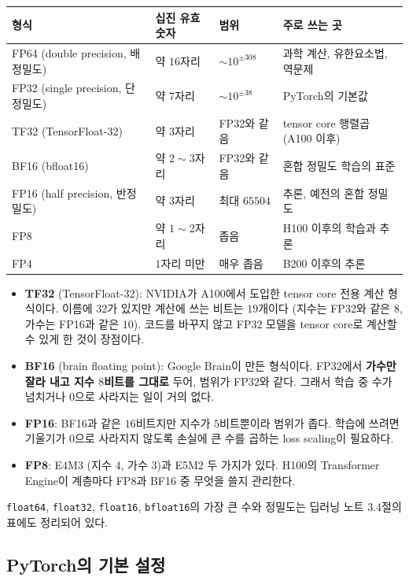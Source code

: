 \documentclass[11pt,a4paper]{article}
\begin{document}
\begin{center}
{\small
\begin{tabular}{@{}llll@{}}
\toprule
형식 & 십진 유효숫자 & 범위 & 주로 쓰는 곳 \\
\midrule
FP64 (double precision, 배정밀도) & 약 $16$자리 & $\sim10^{\pm308}$ & 과학 계산, 유한요소법, 역문제 \\
FP32 (single precision, 단정밀도) & 약 $7$자리 & $\sim10^{\pm38}$ & PyTorch의 기본값 \\
TF32 (TensorFloat-32) & 약 $3$자리 & FP32와 같음 & tensor core 행렬곱 (A100 이후) \\
BF16 (bfloat16) & 약 $2\sim3$자리 & FP32와 같음 & 혼합 정밀도 학습의 표준 \\
FP16 (half precision, 반정밀도) & 약 $3$자리 & 최대 $65504$ & 추론, 예전의 혼합 정밀도 \\
FP8 & 약 $1\sim2$자리 & 좁음 & H100 이후의 학습과 추론 \\
FP4 & $1$자리 미만 & 매우 좁음 & B200 이후의 추론 \\
\bottomrule
\end{tabular}}
\end{center}

\begin{itemize}[leftmargin=1.5em]
\item \textbf{TF32} (TensorFloat-32): NVIDIA가 A100에서 도입한 tensor core 전용 계산 형식이다. 이름에 $32$가 있지만 계산에 쓰는 비트는 $19$개이다 (지수는 FP32와 같은 $8$, 가수는 FP16과 같은 $10$).
코드를 바꾸지 않고 FP32 모델을 tensor core로 계산할 수 있게 한 것이 장점이다.
\item \textbf{BF16} (brain floating point): Google Brain이 만든 형식이다. FP32에서 \textbf{가수만 잘라 내고 지수 $8$비트를 그대로} 두어, 범위가 FP32와 같다.
그래서 학습 중 수가 넘치거나 $0$으로 사라지는 일이 거의 없다.
\item \textbf{FP16}: BF16과 같은 $16$비트지만 지수가 $5$비트뿐이라 범위가 좁다. 학습에 쓰려면 기울기가 $0$으로 사라지지 않도록 손실에 큰 수를 곱하는 loss scaling이 필요하다.
\item \textbf{FP8}: E4M3 (지수 $4$, 가수 $3$)과 E5M2 두 가지가 있다. H100의 Transformer Engine이 계층마다 FP8과 BF16 중 무엇을 쓸지 관리한다.
\end{itemize}

\texttt{float64}, \texttt{float32}, \texttt{float16}, \texttt{bfloat16}의 가장 큰 수와 정밀도는 딥러닝 노트 3.4절의 표에도 정리되어 있다.

\subsection{PyTorch의 기본 설정}\label{sec:torch_defaults}
\end{document}
